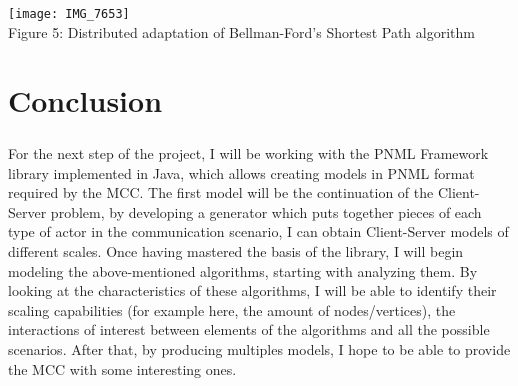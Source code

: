 \documentclass{article}
\begin{document}
		\begin{center}
			\texttt{[image: IMG\_7653]}
			\\Figure 5: Distributed adaptation of Bellman-Ford's Shortest Path algorithm
		\end{center}
	\section{Conclusion}
	\subparagraph{}For the next step of the project, I will be working with the PNML Framework library implemented in Java, which allows creating models in PNML format required by the MCC. The first model will be the continuation of the Client-Server problem, by developing a generator which puts together pieces of each type of actor in the communication scenario, I can obtain Client-Server models of different scales. Once having mastered the basis of the library, I will begin modeling the above-mentioned algorithms, starting with analyzing them. By looking at the characteristics of these algorithms, I will be able to identify their scaling capabilities (for example here, the amount of nodes/vertices), the interactions of interest between elements of the algorithms and all the possible scenarios. After that, by producing multiples models, I hope to be able to provide the MCC with some interesting ones. 


\end{document}
